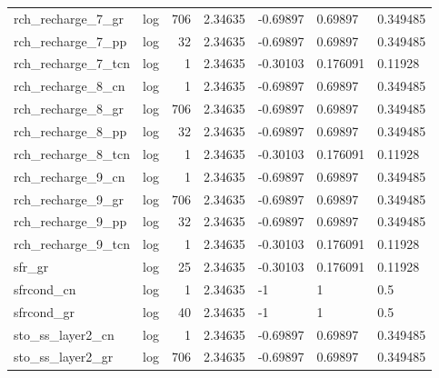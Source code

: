 \documentclass{article}
\begin{document}
\begin{center}
\begin{landscape}
\begin{longtable}{llrllll}
  rch\_recharge\_7\_gr &       log &    706 &        2.34635 &            -0.69897 &            0.69897 &           0.349485 \\
  rch\_recharge\_7\_pp &       log &     32 &        2.34635 &            -0.69897 &            0.69897 &           0.349485 \\
 rch\_recharge\_7\_tcn &       log &      1 &        2.34635 &            -0.30103 &           0.176091 &            0.11928 \\
  rch\_recharge\_8\_cn &       log &      1 &        2.34635 &            -0.69897 &            0.69897 &           0.349485 \\
  rch\_recharge\_8\_gr &       log &    706 &        2.34635 &            -0.69897 &            0.69897 &           0.349485 \\
  rch\_recharge\_8\_pp &       log &     32 &        2.34635 &            -0.69897 &            0.69897 &           0.349485 \\
 rch\_recharge\_8\_tcn &       log &      1 &        2.34635 &            -0.30103 &           0.176091 &            0.11928 \\
  rch\_recharge\_9\_cn &       log &      1 &        2.34635 &            -0.69897 &            0.69897 &           0.349485 \\
  rch\_recharge\_9\_gr &       log &    706 &        2.34635 &            -0.69897 &            0.69897 &           0.349485 \\
  rch\_recharge\_9\_pp &       log &     32 &        2.34635 &            -0.69897 &            0.69897 &           0.349485 \\
 rch\_recharge\_9\_tcn &       log &      1 &        2.34635 &            -0.30103 &           0.176091 &            0.11928 \\
             sfr\_gr &       log &     25 &        2.34635 &            -0.30103 &           0.176091 &            0.11928 \\
         sfrcond\_cn &       log &      1 &        2.34635 &                  -1 &                  1 &                0.5 \\
         sfrcond\_gr &       log &     40 &        2.34635 &                  -1 &                  1 &                0.5 \\
   sto\_ss\_layer2\_cn &       log &      1 &        2.34635 &            -0.69897 &            0.69897 &           0.349485 \\
   sto\_ss\_layer2\_gr &       log &    706 &        2.34635 &            -0.69897 &            0.69897 &           0.349485 \\

\end{longtable}
\end{landscape}
\end{center}
\end{document}

